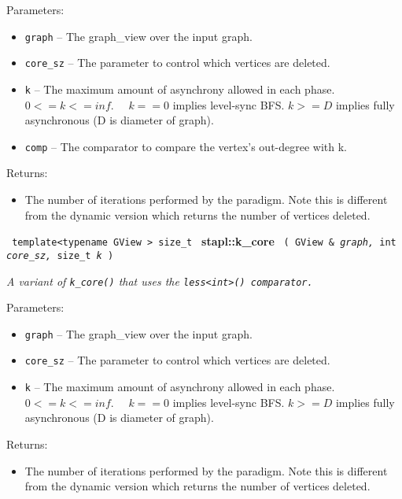 Parameters:
\begin{itemize}
\item
\texttt{graph} --
The graph\_view over the input graph.
\item
\texttt{core\_sz} --
The parameter to control which vertices are deleted.
\item
\texttt{k} --
The maximum amount of asynchrony allowed in each phase. $0 <= k <= inf.$ \ \ $k == 0$ implies level-sync BFS. $k >= D$ implies fully asynchronous (D is diameter of graph).
\item
\texttt{comp} --
The comparator to compare the vertex's out-degree with k.
\end{itemize}

Returns:
\begin{itemize}
\item
The number of iterations performed by the paradigm. Note this is different from the dynamic version which returns the number of vertices deleted. 
\end{itemize}


\noindent
\texttt{%
template<typename GView >
\newline
size\_t 
}
\textbf{stapl::k\_core}%
\newline
\texttt{%
(
GView \&
\textit{graph,}%
int
\textit{core\_sz,}%
size\_t
\textit{k}%
)     
}
\vspace{0.4cm}

\textit{
A variant of 
\texttt{k\_core()} 
that uses the 
\texttt{less<int>() comparator.}
}
\vspace{0.4cm}

Parameters:
\begin{itemize}
\item
\texttt{graph} --
The graph\_view over the input graph.
\item
\texttt{core\_sz} --
The parameter to control which vertices are deleted.
\item
\texttt{k} --
The maximum amount of asynchrony allowed in each phase. $0 <= k <= inf.$ \ \ $k == 0$ implies level-sync BFS. $k >= D$ implies fully asynchronous (D is diameter of graph).
\end{itemize}

Returns:
\begin{itemize}
\item
The number of iterations performed by the paradigm. Note this is different from the dynamic version which returns the number of vertices deleted. 
\end{itemize}

